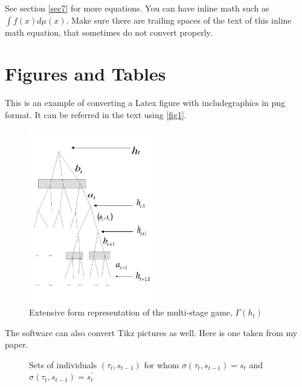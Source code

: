 \documentclass[12pt,svgnames]{article}
\begin{document}
See section \ref{sec7} for more equations.  You can have inline math such as $\int f(x) d\mu(x)$. Make sure there are trailing spaces of the text of this inline math equation, that sometimes do not convert properly.

\section{Figures and Tables} \label{sec5}

This is an example of converting a Latex figure with includegraphics in png format. It can be referred in the text using \autoref{fig1}.
 
\begin{figure}[htbp]
\begin{center}
\includegraphics[height=3.0in,keepaspectratio=true]{tree1.png}
\end{center}
\caption{Extensive form representation of the multi-stage game, $\Gamma(h_t)$}
\label{fig1}
\end{figure}

The software can also convert Tikz pictures as well.  Here is one taken from my \cite{Raut_2017a} paper.

\begin{figure}[tbp]
\begin{center}
\end{center}
\caption{Sets of individuals $(\tau_t,s_{t-1})$ for whom $\sigma(\tau_t,s_{t-1})=s_t$ and $\sigma(\tau _t,s_{t-1})=s^{\prime }_t$}
\label{fig2}
\end{figure}
\end{document}
